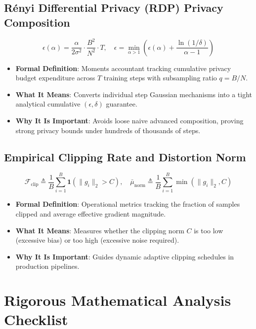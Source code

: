 \documentclass[11pt,a4paper]{article}
\theoremstyle{definition}
\begin{document}
\subsection{R\'enyi Differential Privacy (RDP) Privacy Composition}
{\boldmath
\begin{equation}
\epsilon(\alpha) = \frac{\alpha}{2 \sigma^2} \cdot \frac{B^2}{N^2} \cdot T, \quad \epsilon = \min_{\alpha > 1} \left( \epsilon(\alpha) + \frac{\ln(1/\delta)}{\alpha - 1} \right)
\end{equation}
}
\begin{itemize}
    \item \textbf{Formal Definition}: Moments accountant tracking cumulative privacy budget expenditure across $T$ training steps with subsampling ratio $q = B/N$.
    \item \textbf{What It Means}: Converts individual step Gaussian mechanisms into a tight analytical cumulative $(\epsilon, \delta)$ guarantee.
    \item \textbf{Why It Is Important}: Avoids loose naive advanced composition, proving strong privacy bounds under hundreds of thousands of steps.
\end{itemize}

\subsection{Empirical Clipping Rate and Distortion Norm}
{\boldmath
\begin{equation}
\mathcal{F}_{\text{clip}} \triangleq \frac{1}{B} \sum_{i=1}^B \mathbf{1}\left( \|g_i\|_2 > C \right), \quad \bar{\mu}_{\text{norm}} \triangleq \frac{1}{B} \sum_{i=1}^B \min\left(\|g_i\|_2, C\right)
\end{equation}
}
\begin{itemize}
    \item \textbf{Formal Definition}: Operational metrics tracking the fraction of samples clipped and average effective gradient magnitude.
    \item \textbf{What It Means}: Measures whether the clipping norm $C$ is too low (excessive bias) or too high (excessive noise required).
    \item \textbf{Why It Is Important}: Guides dynamic adaptive clipping schedules in production pipelines.
\end{itemize}

\section{Rigorous Mathematical Analysis Checklist}
\end{document}
